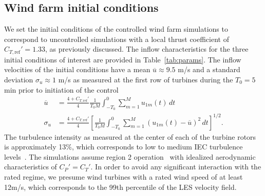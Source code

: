 \subsection{Wind farm initial conditions}
\label{subsec:rhc-pjm-ic}
We set the initial conditions of the controlled wind farm simulations to correspond to uncontrolled simulations with a local thrust coefficient of $C_{T,\text{ref}}'=1.33$, as previously discussed. The inflow characteristics for the three initial conditions of interest are provided in Table~\ref{tab:params}. The inflow velocities of the initial conditions have a mean $\overline{u} \approx 9.5$ m/s and a standard deviation $\sigma_u \approx 1$ m/s as measured at the first row of turbines during the $T_0 = 5$ min prior to initiation of the control
\begin{align}
\overline{u} &= \frac{4 + C_{T,\text{ref}}'}{4}\frac{1}{T_0 M} \int_{-T_0}^0 \sum_{m=1}^M u_{1m}(t) \, dt \\
\sigma_u &= \frac{4 + C_{T,\text{ref}}'}{4} \left[\frac{1}{T_0M} \int_{-T_0}^0\sum_{m=1}^M \left(u_{1m}(t) - \overline{u}\right)^2 \, dt \right]^{1/2}.
\end{align}
The turbulence intensity as measured at the center of each of the turbine rotors is approximately 13\%, which corresponds to low to medium IEC turbulence levels~\cite{IEC2005a}. The simulations assume region 2 operation~\cite{Johnson2006a} with idealized aerodynamic characteristics of $C_P' = C_T'$. In order to avoid any significant interaction with the rated regime, we presume wind turbines with a rated wind speed of at least 12m/s, which corresponds to the 99th percentile of the LES velocity field.


